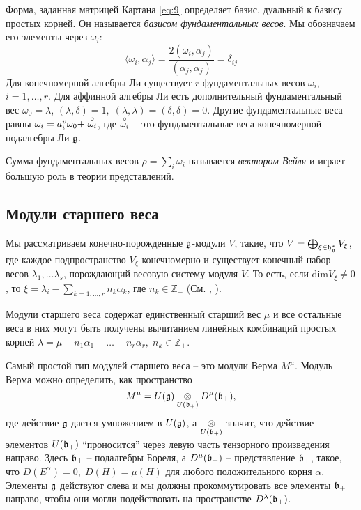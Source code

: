 Форма, заданная матрицей Картана \eqref{eq:9} определяет базис, дуальный к базису простых корней.  Он называется  {\it базисом фундаментальных весов}. Мы обозначаем его элементы через $\omega_i$:
\begin{equation}
  \label{eq:20}
  \langle\omega_i,\alpha_j\rangle=\frac{2(\omega_{i},\alpha_{j})}{(\alpha_{j},\alpha_{j})}=\delta_{ij}
\end{equation}
Для конечномерной алгебры Ли существует $r$ фундаментальных весов $\omega_{i}$, $i=1,\dots, r$. Для аффинной алгебры Ли есть дополнительный фундаментальный вес $\omega_0=\lambda$, $(\lambda,\delta)=1, \; (\lambda,\lambda)=(\delta,\delta)=0$. Другие фундаментальные веса равны $\omega_i=a_i^v \omega_0 +\stackrel{\circ }{\omega_i}$, где $\stackrel{\circ }{\omega_i}$ -- это фундаментальные веса конечномерной подалгебры Ли $\mathfrak{g}$.

Сумма фундаментальных весов $\rho=\sum_{i} \omega_{i}$ называется {\it вектором Вейля} и играет большую роль в теории представлений.

\subsection{Модули старшего веса}
\label{sec:high-weight-modul}

Мы рассматриваем конечно-порожденные  $\mathfrak{g}$-модули $V$, такие, что $V=\bigoplus_{\xi\in \mathfrak{h}_{\mathfrak{g}}^{*}} V_{\xi}$, где каждое подпространство $V_{\xi}$ конечномерно и существует конечный набор весов $\lambda_{1},\dots \lambda_{s}$, порождающий весовую систему модуля $V$. То есть, если $\mathrm{dim}V_{\xi}\neq 0$, то $\xi=\lambda_{i}-\sum_{k=1,\dots, r} n_{k}\alpha_{k}$, где $n_{k}\in \mathbb{Z}_{+}$ (См.  \cite{humphreys2008representations}, \cite{carter2005lie}).

Модули старшего веса содержат единственный старший вес $\mu$ и все остальные веса в них могут быть получены вычитанием линейных комбинаций простых корней $\lambda=\mu-n_{1}\alpha_{1}-\dots-n_{r}\alpha_{r},\; n_{k}\in \mathbb{Z} _{+}$.

Самый простой тип модулей старшего веса -- это модули Верма $M^{\mu}$. Модуль Верма можно определить, как пространство
\begin{equation}
  \label{eq:17}
  M^{\mu}=U(\mathfrak{g})\underset{U(\mathfrak{b}_{+})}{\otimes} D^{\mu}(\mathfrak{b}_{+}),
\end{equation}
где действие $\mathfrak{g}$ дается умножением в $U(\mathfrak{g})$, а
$\underset{U(\mathfrak{b}_{+})}{\otimes}$ значит, что действие элементов $U(\mathfrak{b}_{+})$ ``проносится'' через левую часть тензорного произведения направо. Здесь $\mathfrak{b}_{+}$ -- подалгебры Бореля, а $D^{\mu}(\mathfrak{b}_{+})$ -- представление $\mathfrak{b}_{+}$, такое, что $D(E^{\alpha})=0,\; D(H)=\mu(H)$ для любого положительного корня $\alpha$.
Элементы  $\mathfrak{g}$ действуют слева и мы должны прокоммутировать все элементы $\mathfrak{b}_{+}$ направо, чтобы они могли подействовать на пространстве $D^{\lambda}(\mathfrak{b}_{+})$.


